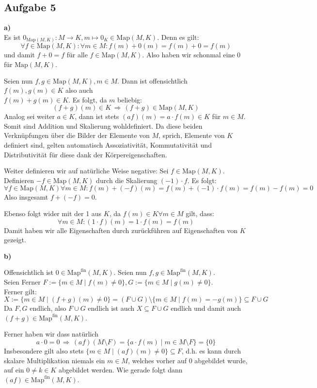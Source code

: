 \documentclass[a4paper,graphics,11pt]{article}
\newcommand{\aufgabe}[1]{\subsection*{Aufgabe #1}}
\begin{document}
\newpage

\aufgabe{5}
\textbf{a)}\\
Es ist $0_{\text{Map}(M,K)} : M \to K, m \mapsto 0_K \in \text{Map}(M,K).$
Denn es gilt:
$$
    \forall f \in \text{Map}(M,K) : \forall m \in M : f(m) + 0(m) = f(m) + 0 = f(m)
$$
und damit $f+0 = f$ für alle $f \in \text{Map}(M,K)$. Also haben wir schonmal eine 0 für $\text{Map}(M,K)$.

Seien nun $f,g \in \text{Map}(M,K), m \in M$.
Dann ist offensichtlich $f(m), g(m) \in K$ also auch\\ $f(m) + g(m) \in K$. Es folgt, da $m$ beliebig:
$$
    (f + g)(m) \in K \,\Longrightarrow\, (f + g) \in \text{Map}(M,K)
$$
Analog sei weiter $a \in K$, dann ist stets $(af)(m) = a\cdot f(m)\in K$ für $m \in M$.\\
Somit sind Addition und Skalierung wohldefiniert. Da diese beiden Verknüpfungen über die Bilder der Elemente von $M$,
sprich, Elemente von $K$ definiert sind, gelten automatisch Assoziativität, Kommutativität und Distributivität für
diese dank der Körpereigenschaften.

Weiter definieren wir auf natürliche Weise negative:
Sei $f \in \text{Map}(M,K)$. Definieren $-f \in \text{Map}(M,K)$ durch die Skalierung $(-1)\cdot f$.
Es folgt:
$$
    \forall f \in \text{Map}(M,K) \forall m \in M : f(m) + (-f)(m) = f(m) + (-1)\cdot f(m) = f(m) - f(m) = 0
$$
Also insgesamt $f + (-f) = 0$.

Ebenso folgt wider mit der 1 aus $K$, da $f(m) \in K \forall m \in M$ gilt, dass:
$$
    \forall m \in M : (1\cdot f)(m) = 1\cdot f(m) = f(m)
$$
Damit haben wir alle Eigenschaften durch zurückführen auf Eigenschaften von $K$ gezeigt.

\textbf{b)}

Offensichtlich ist $0 \in \text{Map}^{\text{fin}}(M,K)$. Seien nun $f,g \in \text{Map}^{\text{fin}}(M,K)$.\\
Seien Ferner $F := \{m \in M \mid f(m) \neq 0\}, G:= \{m \in M \mid g(m) \neq 0\}$.\\
Ferner gilt:
$$
    X := \{m \in M \mid (f+g)(m) \neq 0\} = (F \cup G) \setminus \{m \in M \mid f(m) = - g(m)\}
    \subseteq F \cup G
$$
Da $F,G$ endlich, also $F \cup G$ endlich ist auch $X \subseteq F \cup G$ endlich und damit auch \\
$(f+g) \in \text{Map}^{\text{fin}}(M,K)$.

Ferner haben wir dass natürlich
$$
    a \cdot 0 = 0 \,\Longrightarrow\, (af)(M\setminus F) = \{a\cdot f(m) \mid m \in M\setminus F\} = \{0\}
$$
Insbesondere gilt also stets $\{m \in M \mid (af)(m) \neq 0\} \subseteq F$, d.h. es kann durch skalare Multiplikation
niemals ein $m \in M$, welches vorher auf 0 abgebildet wurde, auf ein $0 \neq k \in K$ abgebildet werden.
Wie gerade folgt dann $(af) \in \text{Map}^{\text{fin}}(M,K)$.
\end{document}
